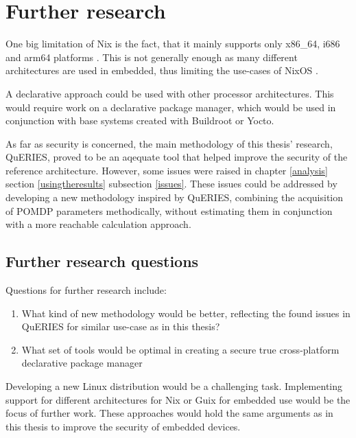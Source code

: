 \chapter{Further research} \label{further}

One big limitation of Nix is the fact, that it mainly supports only
x86\_64, i686 and arm64 platforms \cite{nixosNixOSManual}. This is not
generally enough as many different architectures are used in
embedded, thus limiting the use-cases of
NixOS \cite{fysarakis2014embedded}.

A declarative approach could be used with other processor
architectures. This would require work on a declarative package
manager, which would be used in conjunction with base systems created
with Buildroot or Yocto.

As far as security is concerned, the main methodology of this thesis'
research, QuERIES, proved to be an aqequate tool that helped
improve the security of the reference architecture. However, some
issues were raised in chapter \ref{analysis} section
\ref{usingtheresults} subsection \ref{issues}. These issues could be
addressed by developing a new methodology inspired by QuERIES,
combining the acquisition of POMDP parameters methodically, without estimating them
in conjunction with a more reachable calculation approach.

\section{Further research questions}

Questions for further research include:
\begin{enumerate}
  \item{What kind of new methodology would be better, reflecting
    the found issues in QuERIES for similar use-case as in this
    thesis?}
  \item What set of tools would be optimal in creating a secure true
    cross-platform declarative package manager 
    
\end{enumerate}

Developing a new Linux distribution would be a challenging task. Implementing support for different architectures for Nix or Guix for
embedded use would be the focus of further work. These approaches
would hold the same arguments as in this thesis to improve the
security of embedded devices.

